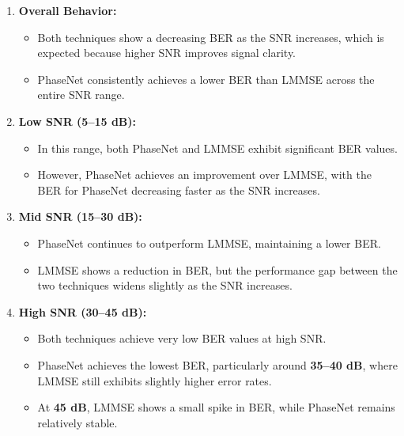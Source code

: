 \begin{enumerate}
    \item \textbf{Overall Behavior:}
    \begin{itemize}
        \item Both techniques show a decreasing BER as the SNR increases, which is expected because higher SNR improves signal clarity.
        \item PhaseNet consistently achieves a lower BER than LMMSE across the entire SNR range.
    \end{itemize}
    
    \item \textbf{Low SNR (5--15 dB):}
    \begin{itemize}
        \item In this range, both PhaseNet and LMMSE exhibit significant BER values.
        \item However, PhaseNet achieves an improvement over LMMSE, with the BER for PhaseNet decreasing faster as the SNR increases.
    \end{itemize}
    
    \item \textbf{Mid SNR (15--30 dB):}
    \begin{itemize}
        \item PhaseNet continues to outperform LMMSE, maintaining a lower BER.
        \item LMMSE shows a reduction in BER, but the performance gap between the two techniques widens slightly as the SNR increases.
    \end{itemize}
    
    \item \textbf{High SNR (30--45 dB):}
    \begin{itemize}
        \item Both techniques achieve very low BER values at high SNR.
        \item PhaseNet achieves the lowest BER, particularly around \textbf{35--40 dB}, where LMMSE still exhibits slightly higher error rates.
        \item At \textbf{45 dB}, LMMSE shows a small spike in BER, while PhaseNet remains relatively stable.
    \end{itemize}
\end{enumerate}